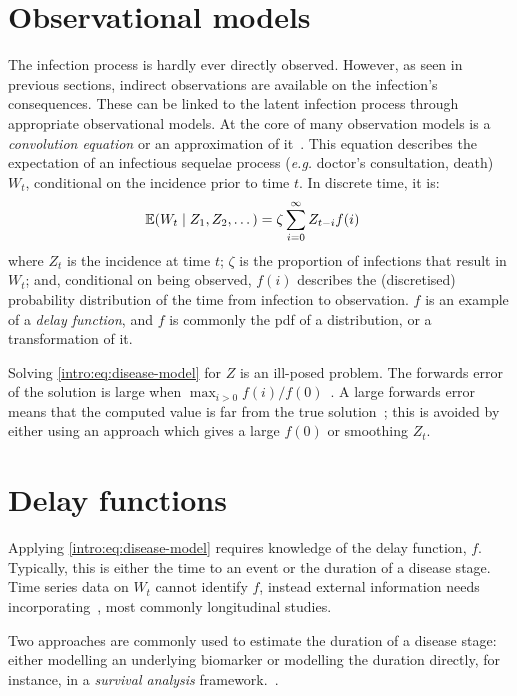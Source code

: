 \documentclass[thesis.tex]{subfiles}
\begin{document}
\section{Observational models} \label{intro:sec:disease-model}

The infection process is hardly ever directly observed.
However, as seen in previous sections, indirect observations are available on the infection's consequences.
These can be linked to the latent infection process through appropriate observational models.
At the core of many observation models is a \emph{convolution equation} or an approximation of it~\autocite[e.g.][]{brookmeyerBackcalculation,abbottEstimating,birrellRealtimea}.
This equation describes the expectation of an infectious sequelae process ({\it e.g.} doctor's consultation, death) $W_t$, conditional on the incidence prior to time $t$.
In discrete time, it is:
\begin{align}
    \operatorname{\mathbb{E}}(W_t \mid Z_1, Z_2, \dots) &= \zeta \sum_{i=0}^\infty Z_{t-i} f(i)
    \label{intro:eq:disease-model}
\end{align}
where $Z_t$ is the incidence at time $t$; $\zeta$ is the proportion of infections that result in $W_t$; and, conditional on being observed, $f(i)$ describes the (discretised) probability distribution of the time from infection to observation.
$f$ is an example of a \emph{delay function}, and  
$f$ is commonly the pdf of a distribution, or a transformation of it.

Solving \cref{intro:eq:disease-model} for $Z$ is an ill-posed problem.
The forwards error of the solution is large when $\max_{i > 0} f(i) / f(0)$~\autocite[chapter 8.2]{highamAccuracy}.
A large forwards error means that the computed value is far from the true solution~\autocite[6--9]{highamAccuracy}; this is avoided by either using an approach which gives a large $f(0)$ or smoothing $Z_t$.

\section{Delay functions}

Applying \cref{intro:eq:disease-model} requires knowledge of the delay function, $f$.
Typically, this is either the time to an event or the duration of a disease stage.
Time series data on $W_t$ cannot identify $f$, instead external information needs incorporating~\autocite{swallow2022challenges}, most commonly longitudinal studies.

Two approaches are commonly used to estimate the duration of a disease stage: either modelling an underlying biomarker or modelling the duration directly, for instance, in a \emph{survival analysis} framework.~\autocite[e.g.][]{sweetingEstimating}.
\end{document}
